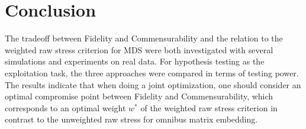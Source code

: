 \documentclass[11pt]{article} %
\begin{document}

\section{Conclusion}
 The tradeoff between Fidelity and Commensurability and the relation to the weighted raw stress criterion for MDS were both investigated with several simulations and experiments on real data.
   For  hypothesis testing as the exploitation task, the three approaches were compared in terms of testing power.
    The results indicate that when doing a joint optimization, one should consider an optimal compromise point between Fidelity and Commensurability,
       which corresponds to an optimal weight $w^*$ of the weighted raw stress criterion in contrast to the unweighted raw stress 
        for omnibus matrix embedding. 
        




\end{document}
